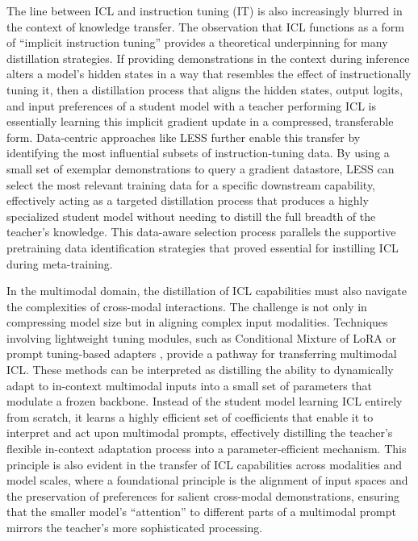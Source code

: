 \documentclass[11pt]{article}
\begin{document}
The line between ICL and instruction tuning (IT) is also increasingly blurred in the context of knowledge transfer. The observation that ICL functions as a form of ``implicit instruction tuning'' \cite{ref9} provides a theoretical underpinning for many distillation strategies. If providing demonstrations in the context during inference alters a model's hidden states in a way that resembles the effect of instructionally tuning it, then a distillation process that aligns the hidden states, output logits, and input preferences of a student model with a teacher performing ICL is essentially learning this implicit gradient update in a compressed, transferable form. Data-centric approaches like LESS \cite{ref194} further enable this transfer by identifying the most influential subsets of instruction-tuning data. By using a small set of exemplar demonstrations to query a gradient datastore, LESS can select the most relevant training data for a specific downstream capability, effectively acting as a targeted distillation process that produces a highly specialized student model without needing to distill the full breadth of the teacher's knowledge. This data-aware selection process parallels the supportive pretraining data identification strategies that proved essential for instilling ICL during meta-training.

In the multimodal domain, the distillation of ICL capabilities must also navigate the complexities of cross-modal interactions. The challenge is not only in compressing model size but in aligning complex input modalities. Techniques involving lightweight tuning modules, such as Conditional Mixture of LoRA \cite{ref195} or prompt tuning-based adapters \cite{ref196}, provide a pathway for transferring multimodal ICL. These methods can be interpreted as distilling the ability to dynamically adapt to in-context multimodal inputs into a small set of parameters that modulate a frozen backbone. Instead of the student model learning ICL entirely from scratch, it learns a highly efficient set of coefficients that enable it to interpret and act upon multimodal prompts, effectively distilling the teacher's flexible in-context adaptation process into a parameter-efficient mechanism. This principle is also evident in the transfer of ICL capabilities across modalities and model scales, where a foundational principle is the alignment of input spaces and the preservation of preferences for salient cross-modal demonstrations, ensuring that the smaller model's ``attention'' to different parts of a multimodal prompt mirrors the teacher's more sophisticated processing.
\end{document}
